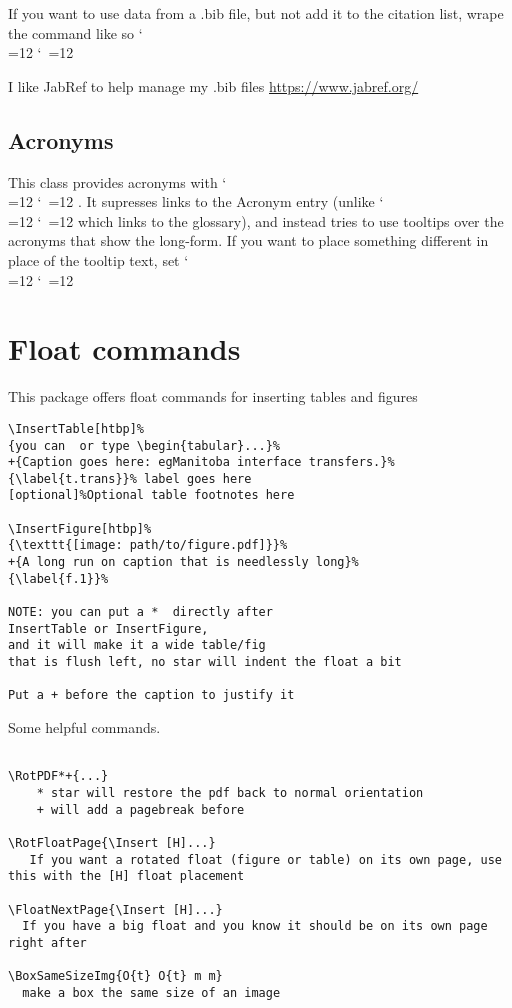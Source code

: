 \documentclass{corpboreport}
\def\cmd{\bgroup\catcode`\\=12 \catcode`\ =12 \cmdA}
\def\cmdA#1{\egroup{\texttt{\detokenize{#1}}}}
\begin{document}
If you want to use data from a .bib file, but not add it to the citation list, wrape the command like so
\cmd{\begin{refsection}\fullcite{#1}\end{refsection}}

I like JabRef to help manage my .bib files \url{https://www.jabref.org/}


\subsection{Acronyms}

This class provides acronyms with \cmd{\ac}. It supresses links to the Acronym entry
(unlike \cmd{\gls{}} which links to the glossary), and instead
tries to use tooltips over the acronyms that show the long-form.
If you want to place something different in place of the tooltip text, set
\cmd{\def\ackeyToolTipText{Text Shown On Tooltip For: ackey}}



\section{Float commands}

This package offers float commands for inserting tables and figures

\begin{lstlisting}
\InsertTable[htbp]%
{you can  or type \begin{tabular}...}%
+{Caption goes here: egManitoba interface transfers.}%
{\label{t.trans}}% label goes here
[optional]%Optional table footnotes here

\InsertFigure[htbp]%
{\texttt{[image: path/to/figure.pdf]}}%
+{A long run on caption that is needlessly long}%
{\label{f.1}}%

NOTE: you can put a *  directly after
InsertTable or InsertFigure,
and it will make it a wide table/fig
that is flush left, no star will indent the float a bit

Put a + before the caption to justify it
\end{lstlisting}


Some helpful commands.

\begin{lstlisting}

\RotPDF*+{...}
	* star will restore the pdf back to normal orientation
	+ will add a pagebreak before

\RotFloatPage{\Insert [H]...}
   If you want a rotated float (figure or table) on its own page, use this with the [H] float placement

\FloatNextPage{\Insert [H]...}
  If you have a big float and you know it should be on its own page right after

\BoxSameSizeImg{O{t} O{t} m m}
  make a box the same size of an image
\end{lstlisting}
\end{document}
